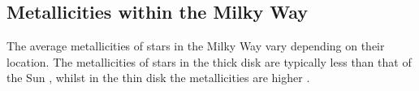 \documentclass[a4paper,twocolumn,12pt]{article}
\begin{document}







\subsection{Metallicities within the Milky Way}
\label{subsection: Metallicities within the Milky Way}
The average metallicities of stars in the Milky Way vary depending on their location. The metallicities of stars in the thick disk are typically less than that of the Sun \cite{ThickDisc}, whilst in the thin disk the metallicities are higher \cite{ThinAndThickDiskKinematics}.
\end{document}
